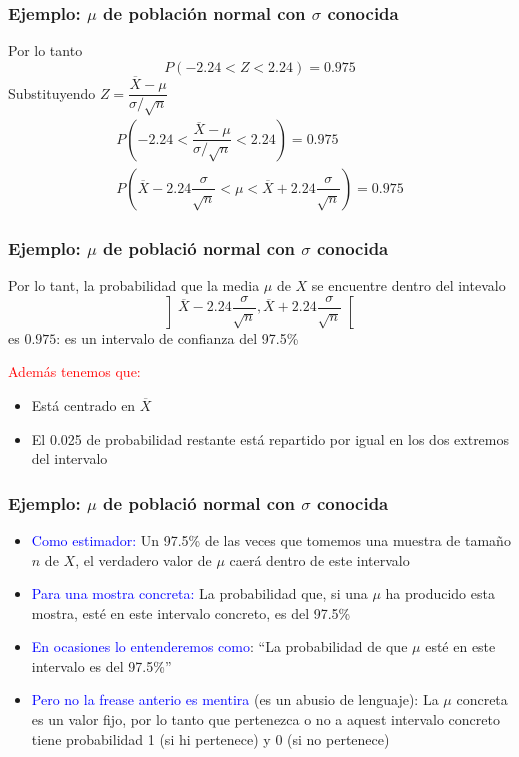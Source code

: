 \documentclass[12pt,t]{beamer}\usepackage[]{graphicx}\usepackage[]{color}
\newcommand{\red}[1]{\textcolor{red}{#1}}
\newcommand{\blue}[1]{\textcolor{blue}{#1}}
\renewcommand{\emph}[1]{{\color{red}#1}}
\theoremstyle{plain}
\theoremstyle{definition}
\begin{document}
\begin{frame}
\frametitle{Ejemplo: $\mu$ de población normal con $\sigma$ conocida}
Por lo tanto
$$
P(-2.24<Z<2.24)=0.975
$$
Substituyendo $Z=\dfrac{\overline{X}-\mu}{\sigma/\sqrt{n}}$
$$
\begin{array}{c}
P\left(-2.24<\dfrac{\overline{X}-\mu}{\sigma/\sqrt{n}}
<2.24\right)=0.975\\[3ex]
P\left(\overline{X} -2.24 \dfrac{\sigma}{\sqrt{n}}< \mu< \overline{X}+
2.24\dfrac{\sigma}{\sqrt{n}}\right)=0.975
\end{array}
$$
\end{frame}

\begin{frame}
\frametitle{Ejemplo: $\mu$ de població normal con $\sigma$ conocida}
Por  lo tant, la probabilidad que la media  $\mu$ de $X$ 
se encuentre dentro del intevalo
$$
\left]\overline{X} -2.24 \frac{\sigma}{\sqrt{n}},
\overline{X}+ 2.24\frac{\sigma}{\sqrt{n}}
\right[
$$
es $0.975$: es un intervalo de confianza  del 97.5\%
\pause\medskip

\red{Además tenemos que:}
\begin{itemize}
\item Está centrado en $\overline{X}$
\medskip

\item El 0.025 de probabilidad restante  está repartido por igual en los dos extremos del intervalo
\end{itemize}
\end{frame}

\begin{frame}
\frametitle{Ejemplo: $\mu$ de població normal con $\sigma$ conocida}


\begin{itemize}
\item \blue{Como  estimador:} Un 97.5\% de las veces  que tomemos una muestra de tamaño $n$ de $X$, el verdadero valor de $\mu$ caerá dentro de este intervalo 
\medskip

\item \blue{Para una mostra concreta:} La probabilidad que, si  una $\mu$ ha producido esta mostra, esté en este intervalo concreto, es del 97.5\%
\medskip

\item \blue{En ocasiones lo entenderemos como}:  ``La probabilidad de que $\mu$ esté en este intervalo  es del 97.5\%''
\medskip

\item \blue{Pero no la frease anterio es mentira} (\emph{es un abusio de lenguaje}): La $\mu$ concreta es un valor fijo, por lo  tanto  que pertenezca o   no a aquest intervalo concreto tiene probabilidad 1 (si hi pertenece) y 0 (si no  pertenece) 
\end{itemize}


\end{frame}
\end{document}
